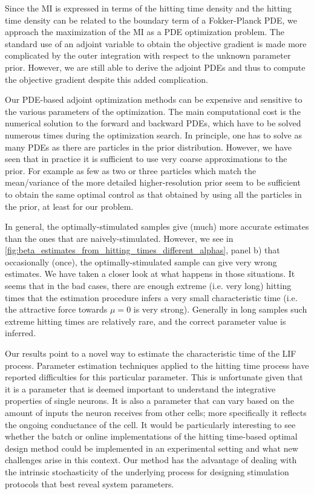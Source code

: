 Since the MI is expressed in terms of the hitting time density
and the hitting time density can be related to the boundary term of a
Fokker-Planck PDE, we approach the maximization of the MI as a
PDE optimization problem. The standard use of an adjoint variable to obtain the
objective gradient is made more complicated by the outer integration with
respect to the unknown parameter prior. However, we are still able to derive the
adjoint PDEs and thus to compute the objective gradient despite this added
complication.
 
Our PDE-based adjoint optimization methods can be expensive and sensitive to the
various parameters of the optimization. The main computational cost is the
numerical solution to the forward and backward PDEs, which have to be solved
numerous times during the optimization search. In principle, one has to solve as
many PDEs as there are particles in the prior distribution. However, we have
seen that in practice it is sufficient to use very coarse approximations to the
prior. For example as few as two or three particles which match the
mean/variance of the more detailed higher-resolution prior seem to be sufficient
to obtain the same optimal control as that obtained by using all the particles
in the prior, at least for our problem.
 
In general, the optimally-stimulated samples give (much) more accurate estimates
than the ones that are naively-stimulated. However, we see in
\cref{fig:beta_estimates_from_hitting_times_different_alphas}, panel b) that
occasionally (once), the optimally-stimulated sample can give very wrong
estimates. We have taken a closer look at what happens in those situations. 
It seems that in the bad cases, there are enough extreme (i.e. very long)
hitting times that the estimation procedure infers a very small characteristic
time (i.e. the attractive force towards $\mu=0$ is very strong). Generally in
long samples such extreme hitting times are relatively rare, and the correct
parameter value is inferred.

Our results point to a novel way to estimate the characteristic time of the LIF
process. Parameter estimation techniques applied to the hitting time process
have reported difficulties for this particular parameter. This is unfortunate
given that it is a parameter that is deemed important to understand the
integrative properties of single neurons. It is also a parameter that can vary
based on the amount of inputs the neuron receives from other cells; more
specifically it reflects the ongoing conductance of the cell. It would be
particularly interesting to see whether the batch or online implementations of
the hitting time-based optimal design method could be implemented in an
experimental setting and what new challenges arise in this context. Our method
has the advantage of dealing with the intrinsic stochasticity of the underlying
process for designing stimulation protocols that best reveal system parameters.
 
